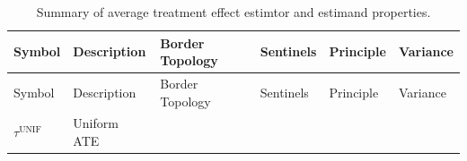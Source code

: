 \documentclass[letter]{article}
\newcommand{\unifavg}{\tau^{\mathrm{UNIF}}}
\begin{document}
\begin{longtable}[]{@{}llllll@{}}
\caption{Summary of average treatment effect estimtor and estimand properties. \label{table:estimator_properties}}\tabularnewline
\toprule
\begin{minipage}[b]{0.09\columnwidth}\raggedright\strut
Symbol\strut
\end{minipage} & \begin{minipage}[b]{0.25\columnwidth}\raggedright\strut
Description\strut
\end{minipage} & \begin{minipage}[b]{0.13\columnwidth}\raggedright\strut
Border Topology\strut
\end{minipage} & \begin{minipage}[b]{0.13\columnwidth}\raggedright\strut
Sentinels\strut
\end{minipage} & \begin{minipage}[b]{0.15\columnwidth}\raggedright\strut
Principle\strut
\end{minipage} & \begin{minipage}[b]{0.08\columnwidth}\raggedright\strut
Variance\strut
\end{minipage}\tabularnewline
\midrule
\endfirsthead
\toprule
\begin{minipage}[b]{0.09\columnwidth}\raggedright\strut
Symbol\strut
\end{minipage} & \begin{minipage}[b]{0.25\columnwidth}\raggedright\strut
Description\strut
\end{minipage} & \begin{minipage}[b]{0.13\columnwidth}\raggedright\strut
Border Topology\strut
\end{minipage} & \begin{minipage}[b]{0.13\columnwidth}\raggedright\strut
Sentinels\strut
\end{minipage} & \begin{minipage}[b]{0.15\columnwidth}\raggedright\strut
Principle\strut
\end{minipage} & \begin{minipage}[b]{0.08\columnwidth}\raggedright\strut
Variance\strut
\end{minipage}\tabularnewline
\midrule
\endhead
\begin{minipage}[t]{0.09\columnwidth}\raggedright\strut
\(\unifavg\)\strut
\end{minipage} & \begin{minipage}[t]{0.25\columnwidth}\raggedright\strut
Uniform ATE\strut

\end{minipage}
\end{longtable}
\end{document}
